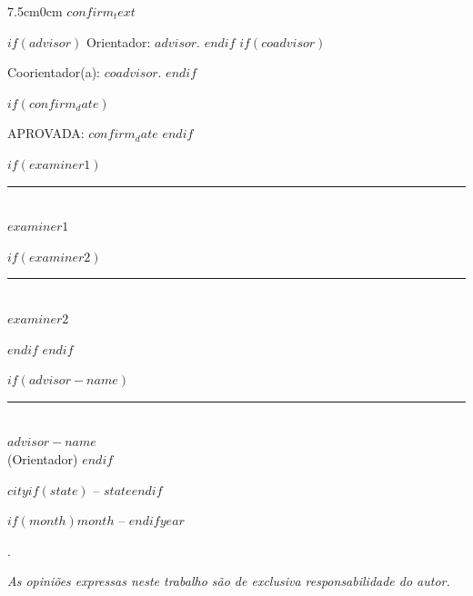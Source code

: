 \begin{adjustwidth}{7.5cm}{0cm}
    \justifying
    $confirm_text$

    \setlength{\parindent}{0pt}

$if(advisor)$
    Orientador: $advisor$.
$endif$
$if(coadvisor)$

    Coorientador(a): $coadvisor$.
$endif$
\end{adjustwidth}

$if(confirm_date)$
\vspace{1.5cm}

APROVADA: $confirm_date$
$endif$

$if(examiner1)$
\vspace{1.5cm}

\begin{minipage}{0.45\textwidth}
    \centering
    \rule{6cm}{0.4pt} \\
    $examiner1$
\end{minipage}%
$if(examiner2)$
\hspace{0.05\textwidth}
\begin{minipage}{0.45\textwidth}
    \centering
    \rule{6cm}{0.4pt} \\
    $examiner2$
\end{minipage}
$endif$
$endif$

$if(advisor-name)$
\vspace{2.0cm}

\centering
\rule{6cm}{0.4pt} \\
$advisor-name$ \\
(Orientador)
$endif$

\vspace{2.0cm}

\begin{center}
$city$$if(state)$ -- $state$$endif$

$if(month)$$month$ -- $endif$$year$
\end{center}

\newpage

\thispagestyle{empty}

\begin{invisible}.\end{invisible}

\vspace{28\baselineskip}

\textit{As opiniões expressas neste trabalho são de exclusiva responsabilidade do autor.}

\newpage
\pagestyle{fancy}

